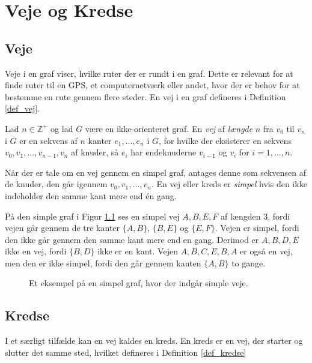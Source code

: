 \chapter{Veje og Kredse}

\section{Veje}
Veje i en graf viser, hvilke ruter der er rundt i en graf. Dette er relevant for at finde ruter til en GPS, et computernetværk eller andet, hvor der er behov for at bestemme en rute gennem flere steder. 
En vej i en graf defineres i Definition \ref{def_vej}.

\begin{defn} \label{def_vej}
	Lad $n \in  \mathbb{Z}^{+}$ og lad $G$ være en ikke-orienteret graf. 
	En \textit{vej} af \textit{længde} $n$ fra $v_0$ til $v_n$ i $G$ er en sekvens af $n$ kanter $e_1, ..., e_n$ i $G$, for hvilke der eksisterer en sekvens $v_0,v_1,...,v_{n-1},v_n$ af knuder, så $e_i$ har endeknuderne $v_{i-1}$ og $v_i$ for $i=1,...,n$.
\end{defn}

Når der er tale om en vej gennem en simpel graf, antages denne som sekvensen af de knuder, den går igennem $v_0, v_1,...,v_n$. 
En vej eller kreds er \textit{simpel} hvis den ikke indeholder den samme kant mere end én gang. 

\begin{exmp} \label{ex_vej}
	På den simple graf i Figur \ref{graf_vej} ses en simpel vej $A,B,E,F$ af længden 3, fordi vejen går gennem de tre kanter $\lbrace A,B \rbrace$, $\lbrace B,E \rbrace$ og $\lbrace E,F \rbrace$. 
	Vejen er simpel, fordi den ikke går gennem den samme kant mere end en gang. 
	Derimod er $A,B,D,E$ ikke en vej, fordi $\lbrace B,D \rbrace$ ikke er en kant. 
	Vejen $A,B,C,E,B,A$ er også en vej, men den er ikke simpel, fordi den går gennem kanten $\lbrace A,B \rbrace$ to gange. 
\end{exmp}

\begin{figure}[h]
	\centering
	
	\caption{Et eksempel på en simpel graf, hvor der indgår simple veje.} \label{graf_vej}
\end{figure}

\section{Kredse}
I et særligt tilfælde kan en vej kaldes en kreds.
En kreds er en vej, der starter og slutter det samme sted, hvilket defineres i Definition \ref{def_kredse}

